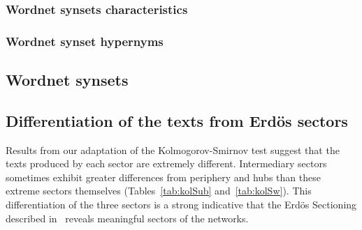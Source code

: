 \subsubsection{Wordnet synsets characteristics}\label{subsec:wn1}
\subsubsection{Wordnet synset hypernyms}\label{subsec:wn1}

\subsection{Wordnet synsets}\label{subsec:wnres}

%
%
%
%
%
%
%
%
%
%
%
%
%





\subsection{Differentiation of the texts from Erd\"os sectors}\label{subsec:di}








Results from our adaptation of the Kolmogorov-Smirnov test
suggest that the texts produced by each sector are extremely different.
Intermediary sectors sometimes exhibit greater differences 
from periphery and hubs than these extreme sectors themselves 
(Tables~\ref{tab:kolSub} and~\ref{tab:kolSw}).
This differentiation of the three sectors is a
strong indicative that the Erd\"os Sectioning
described in~\cite{evoSN} reveals meaningful
sectors of the networks.

